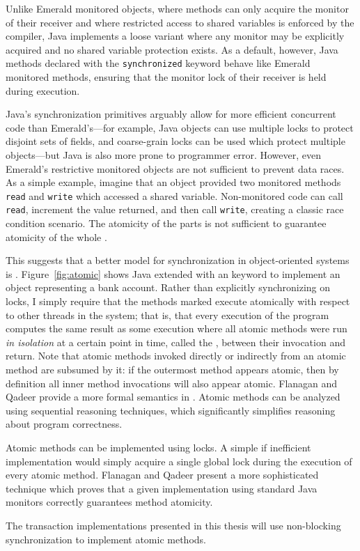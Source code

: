 Unlike Emerald monitored objects, where methods can only acquire the
monitor of their receiver and where restricted access to shared
variables is enforced by the compiler, Java implements a loose
variant where any monitor may be explicitly acquired and no shared
variable protection exists.  As a default, however, Java methods
declared with the {\tt synchronized} keyword behave like Emerald
monitored methods,
ensuring that the monitor lock of their receiver is held during execution.

Java's synchronization primitives arguably allow for more efficient
concurrent code than Emerald's---for example, Java objects can use
multiple locks to
protect disjoint sets of fields, and coarse-grain locks can be used
which protect multiple objects---but Java is also more prone to programmer
error.  However, even Emerald's restrictive
monitored objects are not sufficient to prevent data races.  As a
simple example, imagine that an object provided two monitored methods
{\tt read} and {\tt write} which accessed a shared variable.
Non-monitored code can call {\tt read}, increment the value returned,
and then call {\tt write}, creating a classic race condition scenario.
The atomicity of the parts is not sufficient to guarantee atomicity of
the whole \cite{FlanaganQa03}.

This suggests that a better model for synchronization in
object-oriented systems is .  Figure~\ref{fig:atomic}
shows Java extended with an \atomic keyword to implement an
object representing a bank account.  Rather than explicitly
synchronizing on locks, I simply require that the methods marked
\atomic execute atomically with respect to other threads in the
system; that is, that every execution of the program computes the same
result as some execution where all atomic methods were run \emph{in
  isolation} at a certain point in time, called the
, between their invocation and return.
Note that
atomic methods invoked directly or indirectly from an atomic
method are subsumed by it: if the outermost method appears atomic,
then by definition all inner method invocations will also appear atomic.
Flanagan and Qadeer provide a more formal semantics in \cite{FlanaganQa03}.
Atomic methods can be analyzed using sequential reasoning techniques, which
significantly simplifies reasoning about program correctness.

Atomic methods can be implemented using locks.  A simple if inefficient
implementation would simply acquire a single global lock during
the execution of every atomic method.  Flanagan and Qadeer
\cite{FlanaganQa03} present a more sophisticated technique which proves that
a given implementation using standard Java monitors correctly
guarantees method atomicity.

The transaction implementations presented in this thesis will use
non-blocking synchronization to implement atomic methods.

